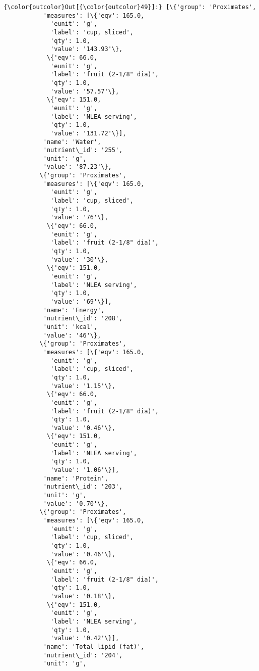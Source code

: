 \documentclass[11pt]{article}
\begin{document}
\begin{Verbatim}[commandchars=\\\{\}]
{\color{outcolor}Out[{\color{outcolor}49}]:} [\{'group': 'Proximates',
           'measures': [\{'eqv': 165.0,
             'eunit': 'g',
             'label': 'cup, sliced',
             'qty': 1.0,
             'value': '143.93'\},
            \{'eqv': 66.0,
             'eunit': 'g',
             'label': 'fruit (2-1/8" dia)',
             'qty': 1.0,
             'value': '57.57'\},
            \{'eqv': 151.0,
             'eunit': 'g',
             'label': 'NLEA serving',
             'qty': 1.0,
             'value': '131.72'\}],
           'name': 'Water',
           'nutrient\_id': '255',
           'unit': 'g',
           'value': '87.23'\},
          \{'group': 'Proximates',
           'measures': [\{'eqv': 165.0,
             'eunit': 'g',
             'label': 'cup, sliced',
             'qty': 1.0,
             'value': '76'\},
            \{'eqv': 66.0,
             'eunit': 'g',
             'label': 'fruit (2-1/8" dia)',
             'qty': 1.0,
             'value': '30'\},
            \{'eqv': 151.0,
             'eunit': 'g',
             'label': 'NLEA serving',
             'qty': 1.0,
             'value': '69'\}],
           'name': 'Energy',
           'nutrient\_id': '208',
           'unit': 'kcal',
           'value': '46'\},
          \{'group': 'Proximates',
           'measures': [\{'eqv': 165.0,
             'eunit': 'g',
             'label': 'cup, sliced',
             'qty': 1.0,
             'value': '1.15'\},
            \{'eqv': 66.0,
             'eunit': 'g',
             'label': 'fruit (2-1/8" dia)',
             'qty': 1.0,
             'value': '0.46'\},
            \{'eqv': 151.0,
             'eunit': 'g',
             'label': 'NLEA serving',
             'qty': 1.0,
             'value': '1.06'\}],
           'name': 'Protein',
           'nutrient\_id': '203',
           'unit': 'g',
           'value': '0.70'\},
          \{'group': 'Proximates',
           'measures': [\{'eqv': 165.0,
             'eunit': 'g',
             'label': 'cup, sliced',
             'qty': 1.0,
             'value': '0.46'\},
            \{'eqv': 66.0,
             'eunit': 'g',
             'label': 'fruit (2-1/8" dia)',
             'qty': 1.0,
             'value': '0.18'\},
            \{'eqv': 151.0,
             'eunit': 'g',
             'label': 'NLEA serving',
             'qty': 1.0,
             'value': '0.42'\}],
           'name': 'Total lipid (fat)',
           'nutrient\_id': '204',
           'unit': 'g',

\end{Verbatim}
\end{document}

